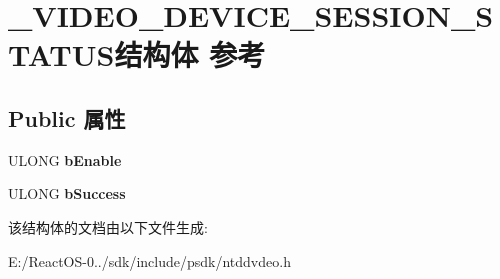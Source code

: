 \hypertarget{struct___v_i_d_e_o___d_e_v_i_c_e___s_e_s_s_i_o_n___s_t_a_t_u_s}{}\section{\+\_\+\+V\+I\+D\+E\+O\+\_\+\+D\+E\+V\+I\+C\+E\+\_\+\+S\+E\+S\+S\+I\+O\+N\+\_\+\+S\+T\+A\+T\+U\+S结构体 参考}
\label{struct___v_i_d_e_o___d_e_v_i_c_e___s_e_s_s_i_o_n___s_t_a_t_u_s}
\subsection*{Public 属性}
\begin{DoxyCompactItemize}
\item 
\mbox{\label{struct___v_i_d_e_o___d_e_v_i_c_e___s_e_s_s_i_o_n___s_t_a_t_u_s_a67d11eb0267395a6f59a7aacc8d2d7ac}} 
U\+L\+O\+NG {\bfseries b\+Enable}
\item 
\mbox{\label{struct___v_i_d_e_o___d_e_v_i_c_e___s_e_s_s_i_o_n___s_t_a_t_u_s_a9bdff325b71b5bd224c49f9e48f1ef64}} 
U\+L\+O\+NG {\bfseries b\+Success}
\end{DoxyCompactItemize}


该结构体的文档由以下文件生成\+:\begin{DoxyCompactItemize}
\item 
E\+:/\+React\+O\+S-\/0../sdk/include/psdk/ntddvdeo.\+h\end{DoxyCompactItemize}
